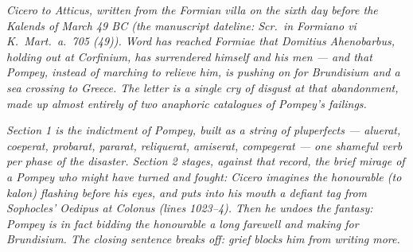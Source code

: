 
\textit{Cicero to Atticus, written from the Formian
villa on the sixth day before the Kalends of March 49
BC (the manuscript dateline: \textit{Scr.\ in Formiano
vi K.\ Mart.\ a.\ 705 (49)}). Word has reached Formiae
that Domitius Ahenobarbus, holding out at Corfinium,
has surrendered himself and his men --- and that
Pompey, instead of marching to relieve him, is pushing
on for Brundisium and a sea crossing to Greece. The
letter is a single cry of disgust at that abandonment,
made up almost entirely of two anaphoric catalogues of
Pompey's failings.}

\textit{Section 1 is the indictment of Pompey, built
as a string of pluperfects --- \textit{aluerat,
coeperat, probarat, pararat, reliquerat, amiserat,
compegerat} --- one shameful verb per phase of the
disaster. Section 2 stages, against that record, the
brief mirage of a Pompey who might have turned and
fought: Cicero imagines the honourable
(\textit{to kalon}) flashing before his eyes, and puts
into his mouth a defiant tag from Sophocles' \textit{Oedipus
at Colonus} (lines 1023--4). Then he undoes the
fantasy: Pompey is in fact bidding the honourable a
long farewell and making for Brundisium. The closing
sentence breaks off: grief blocks him from writing
more.}
